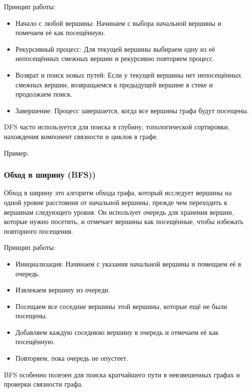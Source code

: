 \documentclass{article}
\begin{document}
Принцип работы:
\begin{itemize}
\item Начало с любой вершины: Начинаем с выбора начальной вершины и помечаем её как посещённую.

\item  Рекурсивный процесс: Для текущей вершины выбираем одну из её непосещённых смежных вершин и рекурсивно повторяем процесс.

\item  Возврат и поиск новых путей: Если у текущей вершины нет непосещённых смежных вершин, возвращаемся к предыдущей вершине в стеке и продолжаем поиск.

\item Завершение: Процесс завершается, когда все вершины графа будут посещены.

\end{itemize}

DFS часто используется для поиска в глубину, топологической сортировки, нахождения компонент связности и циклов в графе.

Пример:

\pagebreak

\subsubsection*{Обход в ширину  (BFS))}
Обход в ширину это алгоритм обхода графа, который исследует вершины на одной уровне расстояния от начальной вершины, прежде чем переходить к вершинам следующего уровня. Он использует очередь для хранения вершин, которые нужно посетить, и отмечает вершины как посещённые, чтобы избежать повторного посещения.

Принцип работы:
\begin{itemize}
\item Инициализация: Начинаем с указания начальной вершины и помещаем её в очередь.

\item Извлекаем вершину из очереди.

\item Посещаем все соседние вершины этой вершины, которые ещё не были посещены.

\item Добавляем каждую соседнюю вершину в очередь и отмечаем её как посещённую.

\item Повторяем, пока очередь не опустеет.

\end{itemize}
BFS особенно полезен для поиска кратчайшего пути в невзвешенных графах и проверки связности графа.
\end{document}

